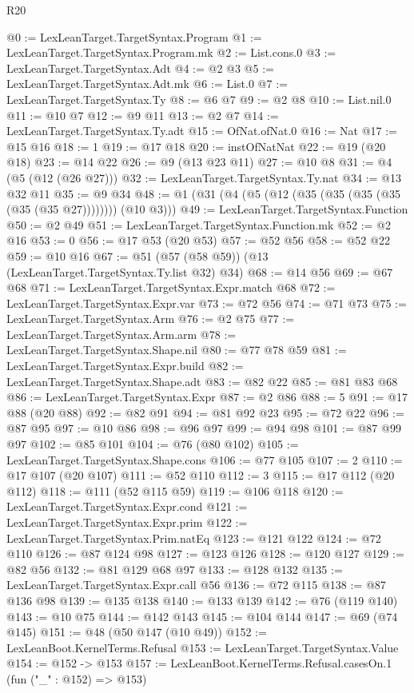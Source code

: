 \begin{lexlean}{R20}
\begin{coremodule}
@0 := LexLeanTarget.TargetSyntax.Program
@1 := LexLeanTarget.TargetSyntax.Program.mk
@2 := List.cons.{0}
@3 := LexLeanTarget.TargetSyntax.Adt
@4 := @2 @3
@5 := LexLeanTarget.TargetSyntax.Adt.mk
@6 := List.{0}
@7 := LexLeanTarget.TargetSyntax.Ty
@8 := @6 @7
@9 := @2 @8
@10 := List.nil.{0}
@11 := @10 @7
@12 := @9 @11
@13 := @2 @7
@14 := LexLeanTarget.TargetSyntax.Ty.adt
@15 := OfNat.ofNat.{0}
@16 := Nat
@17 := @15 @16
@18 := 1
@19 := @17 @18
@20 := instOfNatNat
@22 := @19 (@20 @18)
@23 := @14 @22
@26 := @9 (@13 @23 @11)
@27 := @10 @8
@31 := @4 (@5 (@12 (@26 @27)))
@32 := LexLeanTarget.TargetSyntax.Ty.nat
@34 := @13 @32 @11
@35 := @9 @34
@48 := @1 (@31 (@4 (@5 (@12 (@35 (@35 (@35 (@35 (@35 (@35 @27)))))))) (@10 @3)))
@49 := LexLeanTarget.TargetSyntax.Function
@50 := @2 @49
@51 := LexLeanTarget.TargetSyntax.Function.mk
@52 := @2 @16
@53 := 0
@56 := @17 @53 (@20 @53)
@57 := @52 @56
@58 := @52 @22
@59 := @10 @16
@67 := @51 (@57 (@58 @59)) (@13 (LexLeanTarget.TargetSyntax.Ty.list @32) @34)
@68 := @14 @56
@69 := @67 @68
@71 := LexLeanTarget.TargetSyntax.Expr.match @68
@72 := LexLeanTarget.TargetSyntax.Expr.var
@73 := @72 @56
@74 := @71 @73
@75 := LexLeanTarget.TargetSyntax.Arm
@76 := @2 @75
@77 := LexLeanTarget.TargetSyntax.Arm.arm
@78 := LexLeanTarget.TargetSyntax.Shape.nil
@80 := @77 @78 @59
@81 := LexLeanTarget.TargetSyntax.Expr.build
@82 := LexLeanTarget.TargetSyntax.Shape.adt
@83 := @82 @22
@85 := @81 @83 @68
@86 := LexLeanTarget.TargetSyntax.Expr
@87 := @2 @86
@88 := 5
@91 := @17 @88 (@20 @88)
@92 := @82 @91
@94 := @81 @92 @23
@95 := @72 @22
@96 := @87 @95
@97 := @10 @86
@98 := @96 @97
@99 := @94 @98
@101 := @87 @99 @97
@102 := @85 @101
@104 := @76 (@80 @102)
@105 := LexLeanTarget.TargetSyntax.Shape.cons
@106 := @77 @105
@107 := 2
@110 := @17 @107 (@20 @107)
@111 := @52 @110
@112 := 3
@115 := @17 @112 (@20 @112)
@118 := @111 (@52 @115 @59)
@119 := @106 @118
@120 := LexLeanTarget.TargetSyntax.Expr.cond
@121 := LexLeanTarget.TargetSyntax.Expr.prim
@122 := LexLeanTarget.TargetSyntax.Prim.natEq
@123 := @121 @122
@124 := @72 @110
@126 := @87 @124 @98
@127 := @123 @126
@128 := @120 @127
@129 := @82 @56
@132 := @81 @129 @68 @97
@133 := @128 @132
@135 := LexLeanTarget.TargetSyntax.Expr.call @56
@136 := @72 @115
@138 := @87 @136 @98
@139 := @135 @138
@140 := @133 @139
@142 := @76 (@119 @140)
@143 := @10 @75
@144 := @142 @143
@145 := @104 @144
@147 := @69 (@74 @145)
@151 := @48 (@50 @147 (@10 @49))
@152 := LexLeanBoot.KernelTerms.Refusal
@153 := LexLeanTarget.TargetSyntax.Value
@154 := @152 -> @153
@157 := LexLeanBoot.KernelTerms.Refusal.casesOn.{1} (fun ("_" : @152) => @153)

\end{coremodule}
\end{lexlean}
